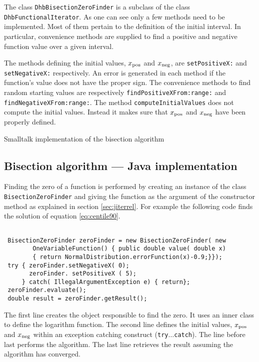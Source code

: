 \documentclass[twoside]{book}
\begin{document}
The class {\tt DhbBisectionZeroFinder} is a subclass of the class
{\tt DhbFunctionalIterator}. As one can see only a few methods
need to be implemented. Most of them pertain to the definition of
the initial interval. In particular, convenience methods are
supplied to find a positive and negative function value over a
given interval.

The methods defining the initial values, $x_{\mathop{\rm pos}}$
and $x_{\mathop{\rm neg}}$, are {\tt setPositiveX:} and {\tt
setNegativeX:} respectively. An error is generated in each method
if the function's value does not have the proper sign. The
convenience methods to find random starting values are
respectively {\tt findPositiveXFrom:range:} and {\tt
findNegativeXFrom:range:}. The method {\tt computeInitialValues}
does not compute the initial values. Instead it makes sure that
$x_{\mathop{\rm pos}}$ and $x_{\mathop{\rm neg}}$ have been
properly defined.

\begin{listing} Smalltalk implementation of the bisection algorithm \label{ls:bisection}

\end{listing}

\subsection{Bisection algorithm --- Java  implementation}
Finding the zero of a function is performed by creating an
instance of the class {\tt BisectionZeroFinder} and giving the
function as the argument of the constructor method as explained in
section \ref{sec:jiterrel}. For example the following code finds
the solution of equation \ref{eq:centile90}.
\begin{codeExample}
\begin{verbatim}

 BisectionZeroFinder zeroFinder = new BisectionZeroFinder( new
        OneVariableFunction() { public double value( double x)
        { return NormalDistribution.errorFunction(x)-0.9;}});
 try { zeroFinder.setNegativeX( 0);
       zeroFinder. setPositiveX ( 5);
     } catch( IllegalArgumentException e) { return};
 zeroFinder.evaluate();
 double result = zeroFinder.getResult();
\end{verbatim}
\end{codeExample}
The first line creates the object responsible to find the zero. It
uses an inner class to define the logarithm function. The second
line defines the initial values, $x_{\mathop{\rm pos}}$ and
$x_{\mathop{\rm neg}}$ within an exception catching construct
({\tt try$\ldots$catch}). The line before last performs the
algorithm. The last line retrieves the result assuming the
algorithm has converged.
\end{document}
